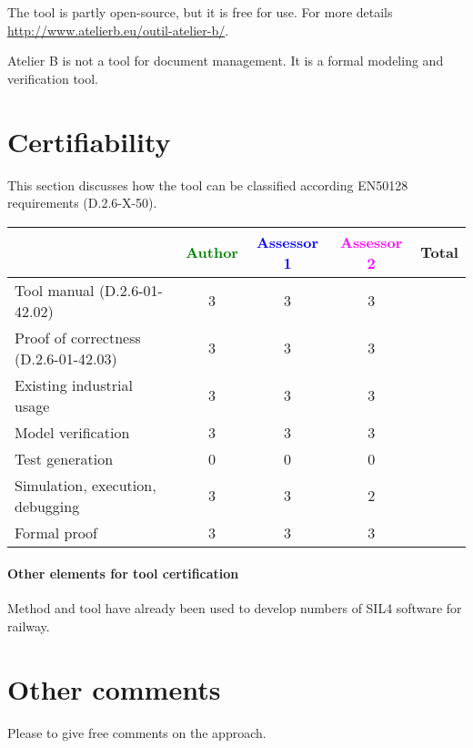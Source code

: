 \begin{author_comment}
The tool is partly open-source, but it is free for use.
For more details \url{http://www.atelierb.eu/outil-atelier-b/}.
\end{author_comment}


\begin{assessor2}
Atelier B is not a tool for document management. It is a formal modeling and verification tool.
\end{assessor2}

\section{Certifiability}

This section discusses how the tool can be classified according EN50128 requirements (D.2.6-X-50).


\begin{tabular}{|l | c | c | c | c|}
\hline
& \textcolor{green}{Author} & \textcolor{blue}{Assessor 1} & \textcolor{magenta}{Assessor 2} & Total \\
\hline 
Tool manual (D.2.6-01-42.02) & 3 & 3 & 3 &  \\
\hline
Proof of correctness (D.2.6-01-42.03)   & 3 & 3 & 3 & \\
\hline
Existing industrial  usage  & 3  & 3 & 3 & \\
\hline
Model verification & 3 & 3 & 3 & \\
\hline
Test generation & 0 & 0 & 0 & \\
\hline
Simulation, execution, debugging & 3 & 3 & 2 & \\
\hline
Formal proof & 3 & 3 & 3 & \\
\hline
\end{tabular}

\paragraph{Other elements for tool certification}


\begin{author_comment}
Method and tool have already been used to  develop numbers of  SIL4 software for railway.
\end{author_comment}


\section{Other comments}
Please to  give free comments on the approach.

